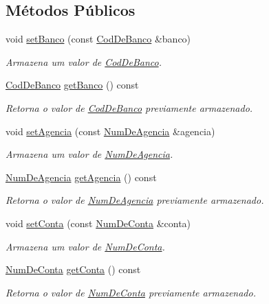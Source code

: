 \subsection*{Métodos Públicos}
\begin{DoxyCompactItemize}
\item 
void \hyperlink{classshibarides_1_1Conta_a9300f2180e88b9df87343193c926badf}{set\+Banco} (const \hyperlink{classshibarides_1_1CodDeBanco}{Cod\+De\+Banco} \&banco)
\begin{DoxyCompactList}\small\item\em Armazena um valor de \hyperlink{classshibarides_1_1CodDeBanco}{Cod\+De\+Banco}. \end{DoxyCompactList}\item 
\hyperlink{classshibarides_1_1CodDeBanco}{Cod\+De\+Banco} \hyperlink{classshibarides_1_1Conta_a40bb0d5f152f61b26a7bd6174af1124f}{get\+Banco} () const 
\begin{DoxyCompactList}\small\item\em Retorna o valor de \hyperlink{classshibarides_1_1CodDeBanco}{Cod\+De\+Banco} previamente armazenado. \end{DoxyCompactList}\item 
void \hyperlink{classshibarides_1_1Conta_a53957be04cf0cd5a7fb783c7d320aa74}{set\+Agencia} (const \hyperlink{classshibarides_1_1NumDeAgencia}{Num\+De\+Agencia} \&agencia)
\begin{DoxyCompactList}\small\item\em Armazena um valor de \hyperlink{classshibarides_1_1NumDeAgencia}{Num\+De\+Agencia}. \end{DoxyCompactList}\item 
\hyperlink{classshibarides_1_1NumDeAgencia}{Num\+De\+Agencia} \hyperlink{classshibarides_1_1Conta_a4131ed3a711e4dd69a9adf3f66cb9abc}{get\+Agencia} () const 
\begin{DoxyCompactList}\small\item\em Retorna o valor de \hyperlink{classshibarides_1_1NumDeAgencia}{Num\+De\+Agencia} previamente armazenado. \end{DoxyCompactList}\item 
void \hyperlink{classshibarides_1_1Conta_ac04fa978221a3b76cd64878ad6853dc7}{set\+Conta} (const \hyperlink{classshibarides_1_1NumDeConta}{Num\+De\+Conta} \&conta)
\begin{DoxyCompactList}\small\item\em Armazena um valor de \hyperlink{classshibarides_1_1NumDeConta}{Num\+De\+Conta}. \end{DoxyCompactList}\item 
\hyperlink{classshibarides_1_1NumDeConta}{Num\+De\+Conta} \hyperlink{classshibarides_1_1Conta_a0f18603982a99ab28e89207ed6bbe96c}{get\+Conta} () const 
\begin{DoxyCompactList}\small\item\em Retorna o valor de \hyperlink{classshibarides_1_1NumDeConta}{Num\+De\+Conta} previamente armazenado. \end{DoxyCompactList}\end{DoxyCompactItemize}
